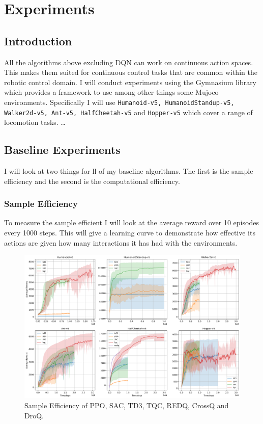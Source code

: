 \chapter{Experiments}\label{C:experiments}

\section{Introduction}

All the algorithms above excluding DQN can work on continuous action spaces. This makes them suited for continuous control tasks that are common within the robotic control domain. I will conduct experiments using the Gymnasium \cite{towers2024gymnasium} library which provides a framework to use among other things some Mujoco \cite{todorov2012mujoco} environments. Specifically I will use \texttt{Humanoid-v5, HumanoidStandup-v5, Walker2d-v5, Ant-v5, HalfCheetah-v5} and \texttt{Hopper-v5} which cover a range of locomotion tasks. \dots

\section{Baseline Experiments}

I will look at two things for ll of my baseline algorithms. The first is the sample efficiency and the second is the computational efficiency.

\subsection{Sample Efficiency}
To measure the sample efficient I will look at the average reward over 10 episodes every 1000 steps. This will give a learning curve to demonstrate how effective its actions are given how many interactions it has had with the environments.

\begin{figure}[H]
    \centering
    \includegraphics[width=1\textwidth]{figures/baseline_results.png}
    \caption{Sample Efficiency of PPO, SAC, TD3, TQC, REDQ, CrossQ and DroQ.}
    \label{fig:sample_efficiency}
\end{figure}

